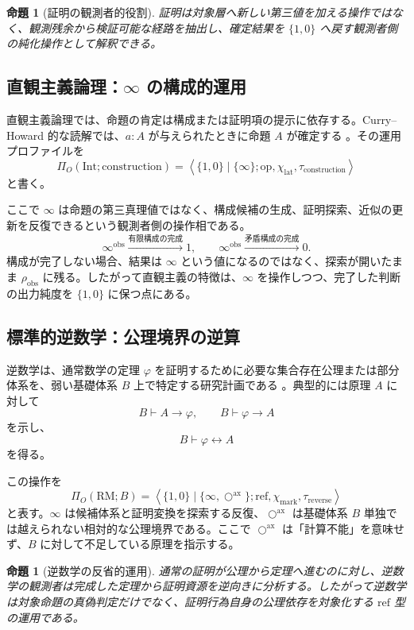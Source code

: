\documentclass[a4paper,11pt]{ltjsarticle}
\theoremstyle{definition}
\theoremstyle{plain}
\newtheorem{proposition}[definition]{命題}
\newcommand{\Phase}{\Pi}
\newcommand{\oax}{\bigcirc^{\mathrm{ax}}}
\newcommand{\Residual}{\rho_{\mathrm{obs}}}
\begin{document}
\begin{proposition}[証明の観測者的役割]
証明は対象層へ新しい第三値を加える操作ではなく、観測残余から検証可能な経路を抽出し、確定結果を $\{1,0\}$ へ戻す観測者側の純化操作として解釈できる。
\end{proposition}

\subsection{直観主義論理：\texorpdfstring{$\infty$}{infinity} の構成的運用}

直観主義論理では、命題の肯定は構成または証明項の提示に依存する。Curry--Howard 的な読解では、$a:A$ が与えられたときに命題 $A$ が確定する \cite{MartinLof1984}。その運用プロファイルを
\[
 \Phase_O(\mathrm{Int};\mathrm{construction})
 =
 \left\langle
 \{1,0\}\mid\{\infty\};
 \mathrm{op},\chi_{\mathrm{lat}},
 \tau_{\mathrm{construction}}
 \right\rangle
\]
と書く。

ここで $\infty$ は命題の第三真理値ではなく、構成候補の生成、証明探索、近似の更新を反復できるという観測者側の操作相である。
\[
 \infty^{\mathrm{obs}}
 \xrightarrow{\text{有限構成の完成}}
 1,
 \qquad
 \infty^{\mathrm{obs}}
 \xrightarrow{\text{矛盾構成の完成}}
 0.
\]
構成が完了しない場合、結果は $\infty$ という値になるのではなく、探索が開いたまま $\Residual$ に残る。したがって直観主義の特徴は、$\infty$ を操作しつつ、完了した判断の出力純度を $\{1,0\}$ に保つ点にある。

\subsection{標準的逆数学：公理境界の逆算}

逆数学は、通常数学の定理 $\varphi$ を証明するために必要な集合存在公理または部分体系を、弱い基礎体系 $B$ 上で特定する研究計画である \cite{Simpson2009}。典型的には原理 $A$ に対して
\[
 B\vdash A\rightarrow\varphi,
 \qquad
 B\vdash\varphi\rightarrow A
\]
を示し、
\[
 B\vdash\varphi\leftrightarrow A
\]
を得る。

この操作を
\[
 \Phase_O(\mathrm{RM};B)
 =
 \left\langle
 \{1,0\}\mid\{\infty,\oax\};
 \mathrm{ref},\chi_{\mathrm{mark}},
 \tau_{\mathrm{reverse}}
 \right\rangle
\]
と表す。$\infty$ は候補体系と証明変換を探索する反復、$\oax$ は基礎体系 $B$ 単独では越えられない相対的な公理境界である。ここで $\oax$ は「計算不能」を意味せず、$B$ に対して不足している原理を指示する。

\begin{proposition}[逆数学の反省的運用]
通常の証明が公理から定理へ進むのに対し、逆数学の観測者は完成した定理から証明資源を逆向きに分析する。したがって逆数学は対象命題の真偽判定だけでなく、証明行為自身の公理依存を対象化する $\mathrm{ref}$ 型の運用である。
\end{proposition}
\end{document}
